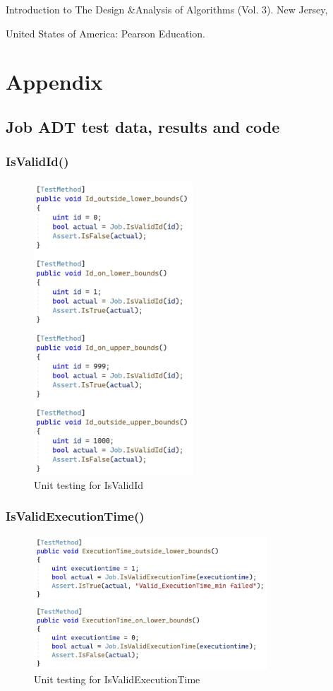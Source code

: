 \documentclass[a4paper]{article}
\begin{document}
Introduction to The Design \&Analysis of Algorithms (Vol. 3). New Jersey, 

United States of America: Pearson Education.
\pagebreak

\section{Appendix}
\subsection{Job ADT test data, results and code}
\subsubsection{IsValidId{()}}
\begin{figure}[H]
   \includegraphics[height=11cm]{images/IsValidId.png}
   \caption{Unit testing for IsValidId}
\end{figure}

\subsubsection{IsValidExecutionTime{()}}
\begin{figure}[H]
   \includegraphics[height=5cm]{images/IsValidExecutionTime.png}
   \caption{Unit testing for IsValidExecutionTime}   
\end{figure}
\end{document}
